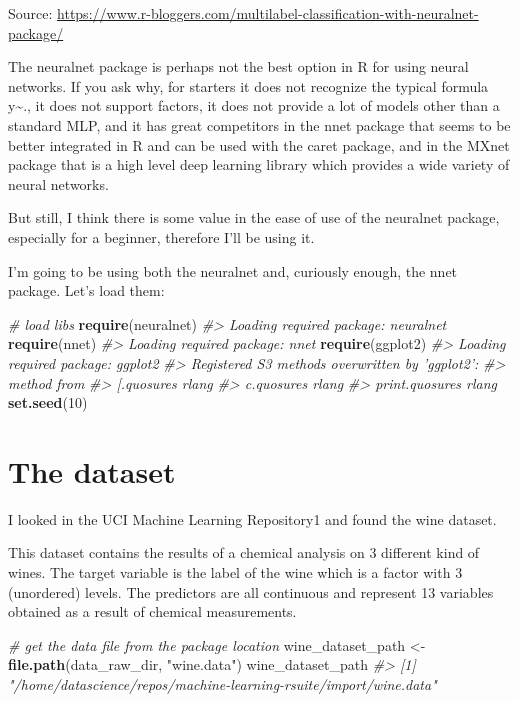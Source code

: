 \documentclass[]{book}
\newenvironment{Shaded}{\begin{snugshade}}{\end{snugshade}}
\newcommand{\CommentTok}[1]{\textcolor[rgb]{0.56,0.35,0.01}{\textit{#1}}}
\newcommand{\DecValTok}[1]{\textcolor[rgb]{0.00,0.00,0.81}{#1}}
\newcommand{\KeywordTok}[1]{\textcolor[rgb]{0.13,0.29,0.53}{\textbf{#1}}}
\newcommand{\NormalTok}[1]{#1}
\newcommand{\StringTok}[1]{\textcolor[rgb]{0.31,0.60,0.02}{#1}}
\begin{document}
Source: \url{https://www.r-bloggers.com/multilabel-classification-with-neuralnet-package/}

The neuralnet package is perhaps not the best option in R for using neural networks. If you ask why, for starters it does not recognize the typical formula y\textasciitilde{}., it does not support factors, it does not provide a lot of models other than a standard MLP, and it has great competitors in the nnet package that seems to be better integrated in R and can be used with the caret package, and in the MXnet package that is a high level deep learning library which provides a wide variety of neural networks.

But still, I think there is some value in the ease of use of the neuralnet package, especially for a beginner, therefore I'll be using it.

I'm going to be using both the neuralnet and, curiously enough, the nnet package. Let's load them:

\begin{Shaded}
\begin{Highlighting}[]
\CommentTok{# load libs}
\KeywordTok{require}\NormalTok{(neuralnet)}
\CommentTok{#> Loading required package: neuralnet}
\KeywordTok{require}\NormalTok{(nnet)}
\CommentTok{#> Loading required package: nnet}
\KeywordTok{require}\NormalTok{(ggplot2)}
\CommentTok{#> Loading required package: ggplot2}
\CommentTok{#> Registered S3 methods overwritten by 'ggplot2':}
\CommentTok{#>   method         from }
\CommentTok{#>   [.quosures     rlang}
\CommentTok{#>   c.quosures     rlang}
\CommentTok{#>   print.quosures rlang}
\KeywordTok{set.seed}\NormalTok{(}\DecValTok{10}\NormalTok{)}
\end{Highlighting}
\end{Shaded}

\hypertarget{the-dataset}{%
\section{The dataset}\label{the-dataset}}

I looked in the UCI Machine Learning Repository1 and found the wine dataset.

This dataset contains the results of a chemical analysis on 3 different kind of wines. The target variable is the label of the wine which is a factor with 3 (unordered) levels. The predictors are all continuous and represent 13 variables obtained as a result of chemical measurements.

\begin{Shaded}
\begin{Highlighting}[]
\CommentTok{# get the data file from the package location}
\NormalTok{wine_dataset_path <-}\StringTok{ }\KeywordTok{file.path}\NormalTok{(data_raw_dir, }\StringTok{"wine.data"}\NormalTok{)}
\NormalTok{wine_dataset_path}
\CommentTok{#> [1] "/home/datascience/repos/machine-learning-rsuite/import/wine.data"}
\end{Highlighting}
\end{Shaded}
\end{document}
